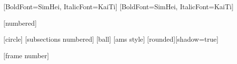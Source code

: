 \usepackage{xcolor}
\usepackage{appendixnumberbeamer}
\usepackage{bookmark}
\usepackage{ctex}
\usepackage{caption}
\usepackage{subfigure}
\usepackage{fontspec}
\usepackage{amsmath}
\usepackage{amsthm}
\usepackage{unicode-math}
\usepackage{amssymb}
\usepackage{graphicx}
\usepackage{float}
\usepackage{color}
\usepackage[
    backend=biber,
    style=authoryear,
    sorting = nty,
    hyperref=true,
    doi=false
]{biblatex}



\setmainfont[Scale=1.0]{STIX Two Text}
\setsansfont[
    BoldFont={STIX Two Text SemiBold},
    ItalicFont={STIX Two Text Italic}
    ]{Arial}
[BoldFont=SimHei, ItalicFont=KaiTi]
[BoldFont=SimHei, ItalicFont=KaiTi]

[numbered]
\setlength{}

[circle]
[subsections numbered]
[ball]
[ams style]
[rounded][shadow=true]

[frame number]

\theoremstyle{remark}
\newtheorem{assump}[theorem]{Identification Assumption}

\newenvironment{wideitemize}{\itemize\addtolength{\itemsep}{0.5em} }{\enditemize}
